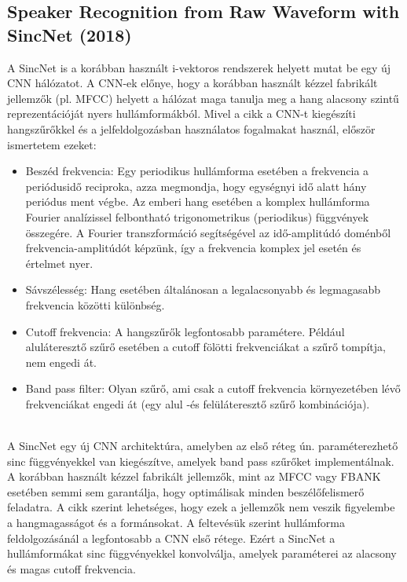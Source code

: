 \subsection{Speaker Recognition from Raw Waveform with SincNet (2018)~\cite{sincnet}}

A SincNet is a korábban használt i-vektoros rendszerek helyett mutat be egy új CNN hálózatot. A CNN-ek előnye, hogy a korábban használt kézzel fabrikált jellemzők (pl. MFCC) helyett a hálózat maga tanulja meg a hang alacsony szintű reprezentációját nyers hullámformákból. Mivel a cikk a CNN-t kiegészíti hangszűrőkkel és a jelfeldolgozásban használatos fogalmakat használ, először ismertetem ezeket:
\begin{itemize}
	\item Beszéd frekvencia: Egy periodikus hullámforma esetében a frekvencia a periódusidő reciproka, azza megmondja, hogy egységnyi idő alatt hány periódus ment végbe. Az emberi hang esetében a komplex hullámforma Fourier analízissel felbontható trigonometrikus (periodikus) függvények összegére. A Fourier transzformáció segítségével az idő-amplitúdó doménből frekvencia-amplitúdót képzünk, így a frekvencia komplex jel esetén és értelmet nyer.
	\item Sávszélesség: Hang esetében általánosan a legalacsonyabb és legmagasabb frekvencia közötti különbség.
	\item Cutoff frekvencia: A hangszűrők legfontosabb paramétere. Például aluláteresztő szűrő esetében a cutoff fölötti frekvenciákat a szűrő tompítja, nem engedi át.
	\item Band pass filter: Olyan szűrő, ami csak a cutoff frekvencia környezetében lévő frekvenciákat engedi át (egy alul -és felüláteresztő szűrő kombinációja).
\end{itemize} 
\ \\
\newline
A SincNet egy új CNN architektúra, amelyben az első réteg ún. paraméterezhető sinc függvényekkel van kiegészítve, amelyek band pass szűrőket implementálnak.
\newline
\newline
A korábban használt kézzel fabrikált jellemzők, mint az MFCC vagy FBANK esetében semmi sem garantálja, hogy optimálisak minden beszélőfelismerő feladatra. A cikk szerint lehetséges, hogy ezek a jellemzők nem veszik figyelembe a hangmagasságot és a formánsokat. A feltevésük szerint hullámforma feldolgozásánál a legfontosabb a CNN első rétege. Ezért a SincNet a hullámformákat sinc függvényekkel konvolválja, amelyek paraméterei az alacsony és magas cutoff frekvencia.

